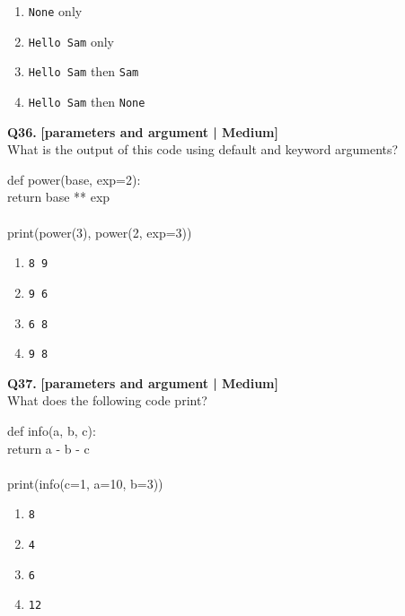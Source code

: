 \begin{enumerate}[label=(\alph*),topsep=2pt,itemsep=1pt,partopsep=0pt,parsep=0pt]
    \item \relax \texttt{None} only
    \item \relax \texttt{Hello Sam} only
    \item \relax \texttt{Hello Sam} then \texttt{Sam}
    \item \relax \texttt{Hello Sam} then \texttt{None}
\end{enumerate}
\vspace{2mm}

\noindent\textbf{Q36.} \hfill {\small\color{LPUOrange}\textbf{[parameters and argument | Medium]}}\\[2pt]
What is the output of this code using default and keyword arguments? 

\begin{pycode}
def power(base, exp=2):\\
return base ** exp\\
~\\
print(power(3), power(2, exp=3))
\end{pycode}

\begin{enumerate}[label=(\alph*),topsep=2pt,itemsep=1pt,partopsep=0pt,parsep=0pt]
    \item \relax \texttt{8 9}
    \item \relax \texttt{9 6}
    \item \relax \texttt{6 8}
    \item \relax \texttt{9 8}
\end{enumerate}
\vspace{2mm}

\noindent\textbf{Q37.} \hfill {\small\color{LPUOrange}\textbf{[parameters and argument | Medium]}}\\[2pt]
What does the following code print? 

\begin{pycode}
def info(a, b, c):\\
return a - b - c\\
~\\
print(info(c=1, a=10, b=3))
\end{pycode}

\begin{enumerate}[label=(\alph*),topsep=2pt,itemsep=1pt,partopsep=0pt,parsep=0pt]
    \item \relax \texttt{8}
    \item \relax \texttt{4}
    \item \relax \texttt{6}
    \item \relax \texttt{12}
\end{enumerate}
\vspace{2mm}

